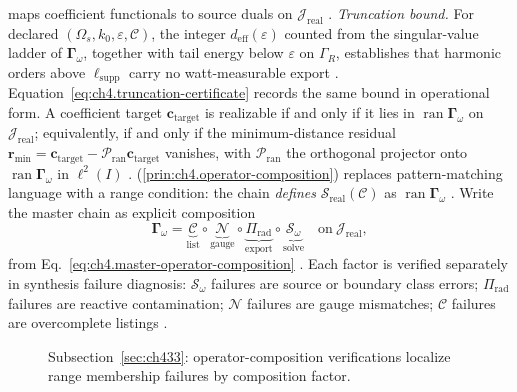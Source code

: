 maps coefficient functionals to source duals on \(\mathcal{J}_{\mathrm{real}}\) \cite{stratton1941}.
\label{prin:ch4.operator-composition}
\emph{Truncation bound.} For declared $(\Omega_s,k_0,\varepsilon,\mathcal{C})$, the integer $d_{\mathrm{eff}}(\varepsilon)$ counted from the singular-value ladder of $\boldsymbol{\Gamma}_\omega$, together with tail energy below $\varepsilon$ on $\Gamma_R$, establishes that harmonic orders above $\ell_{\mathrm{supp}}$ carry no watt-measurable export \cite{hansen1988}. Equation~\eqref{eq:ch4.truncation-certificate} records the same bound in operational form.
A coefficient target \(\mathbf{c}_{\mathrm{target}}\) is realizable if and only if it lies in
\(\operatorname{ran}\boldsymbol{\Gamma}_\omega\) on \(\mathcal{J}_{\mathrm{real}}\); equivalently, if and only if
the minimum-distance residual \(\mathbf{r}_{\min}=\mathbf{c}_{\mathrm{target}}-\mathcal{P}_{\mathrm{ran}}\mathbf{c}_{\mathrm{target}}\)
vanishes, with \(\mathcal{P}_{\mathrm{ran}}\) the orthogonal projector onto
\(\operatorname{ran}\boldsymbol{\Gamma}_\omega\) in \(\ell^{2}(I)\) \cite{stratton1941}.
(\ref{prin:ch4.operator-composition}) replaces pattern-matching language with a range condition: the chain
\emph{defines} \(\mathcal{S}_{\mathrm{real}}(\mathcal{C})\) as \(\operatorname{ran}\boldsymbol{\Gamma}_\omega\)
\cite{hansen1988}. 
Write the master chain as explicit composition
\begin{equation}
\label{eq:ch4.chain-factorization}
\boldsymbol{\Gamma}_\omega
=
\underbrace{\mathcal{C}}_{\text{list}}
\circ
\underbrace{\mathcal{N}}_{\text{gauge}}
\circ
\underbrace{\Pi_{\mathrm{rad}}}_{\text{export}}
\circ
\underbrace{\mathcal{S}_\omega}_{\text{solve}}
\quad\text{on}\ \mathcal{J}_{\mathrm{real}},
\end{equation}
from Eq.~\eqref{eq:ch4.master-operator-composition} \cite{stratton1941}. Each factor is verified
separately in synthesis failure diagnosis: \(\mathcal{S}_\omega\) failures are source or boundary class errors;
\(\Pi_{\mathrm{rad}}\) failures are reactive contamination; \(\mathcal{N}\) failures are gauge mismatches;
\(\mathcal{C}\) failures are overcomplete listings \cite{devaney2004}.
\begin{figure}[t]
\centering
{}
\caption{Subsection~\ref{sec:ch433}: operator-composition verifications localize range membership failures by composition factor.}
\label{fig:ch4.chain-factorization-check}
\end{figure}
